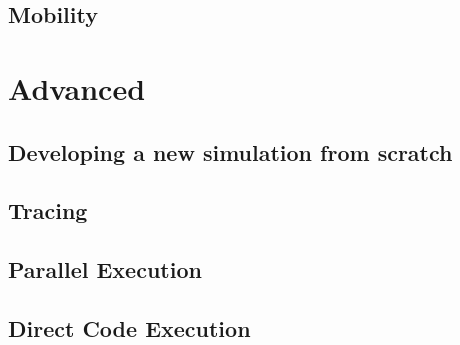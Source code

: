 \documentclass[a4paper]{book}
\begin{document}
\section{Mobility}

\chapter{Advanced}

\section{Developing a new simulation from scratch}


\section{Tracing}

\section{Parallel Execution}


\section{Direct Code Execution}


\nocite{2015ns3_manual}
\nocite{lacage2006yet}
 
\end{document}
